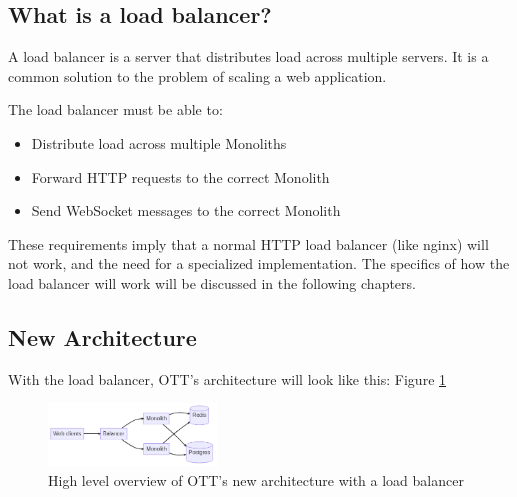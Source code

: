 \subsection{What is a load balancer?}

A load balancer is a server that distributes load across multiple servers. It is a common solution to the problem of scaling a web application.

The load balancer must be able to:
\begin{itemize}
  \item Distribute load across multiple Monoliths
  \item Forward HTTP requests to the correct Monolith
  \item Send WebSocket messages to the correct Monolith
\end{itemize}

These requirements imply that a normal HTTP load balancer (like nginx) will not work, and the need for a specialized implementation. The specifics of how the load balancer will work will be discussed in the following chapters.

\subsection{New Architecture}

With the load balancer, OTT's architecture will look like this: Figure \ref{fig:ott-architecture-with-load-balancer}

\begin{figure}[!h]
  \centering
  \includegraphics[width=0.4\textwidth]{Figures/ott-architecture-with-load-balancer.png}
  \caption{High level overview of OTT's new architecture with a load balancer}
  \label{fig:ott-architecture-with-load-balancer}
\end{figure}
